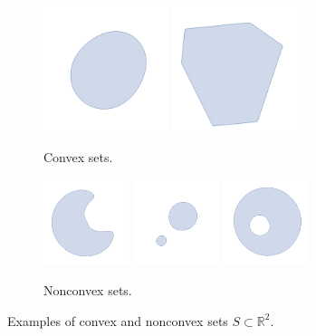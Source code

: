 \documentclass[11pt]{article}
\theoremstyle{definition} %
\begin{document}
\begin{figure}[h]
	\centering
	
	\begin{subfigure}{0.4\textwidth}
		\centering
		\includegraphics[width=0.4\textwidth]{figures/convexset01.png} \includegraphics[width=0.4\textwidth]{figures/convexset02.png}
		\caption{Convex sets.}
	\end{subfigure}
	\hfill
	\begin{subfigure}{0.575\textwidth}
		\centering
		\includegraphics[width=0.275\textwidth]{figures/nonconvexset01.png} \includegraphics[width=0.275\textwidth]{figures/nonconvexset02.png} \includegraphics[width=0.275\textwidth]{figures/nonconvexset03.png}
		\caption{Nonconvex sets.}
	\end{subfigure}
	
	\caption{Examples of convex and nonconvex sets $S \subset \mathbb{R}^2$.}
	\label{fig:convexset}
\end{figure}
\end{document}
